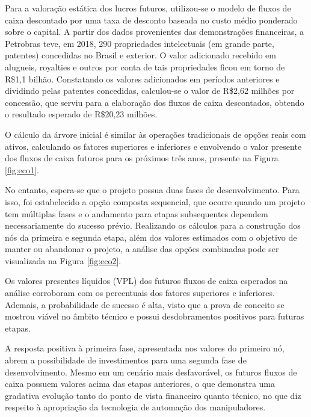 Para a valoração estática dos lucros futuros, utilizou-se o modelo de fluxos de caixa descontado por uma taxa de desconto baseada no custo médio ponderado sobre o capital. A partir dos dados provenientes das demonstrações financeiras, a Petrobras teve, em 2018, 290 propriedades intelectuais (em grande parte, patentes) concedidas no Brasil e exterior. O valor adicionado recebido em alugueis, royalties e outros por conta de tais propriedades ficou em torno de R\$1,1 bilhão. Constatando os valores adicionados em períodos anteriores e dividindo pelas patentes concedidas, calculou-se o valor de R\$2,62 milhões por concessão, que serviu para a elaboração dos fluxos de caixa descontados, obtendo o resultado esperado de R\$20,23 milhões. 

O cálculo da árvore inicial é similar às operações tradicionais de opções reais com ativos, calculando os fatores superiores e inferiores e envolvendo o valor presente dos fluxos de caixa futuros para os próximos três anos, presente na Figura \ref{fig:eco1}.


No entanto, espera-se que o projeto possua duas fases de desenvolvimento. Para isso, foi estabelecido a opção composta sequencial, que ocorre quando um projeto tem múltiplas fases e o andamento para etapas subsequentes dependem necessariamente do sucesso prévio. Realizando os cálculos para a construção dos nós da primeira e segunda etapa, além dos valores estimados com o objetivo de manter ou abandonar o projeto, a análise das opções combinadas pode ser visualizada na Figura \ref{fig:eco2}. 

Os valores presentes líquidos (VPL) dos futuros fluxos de caixa esperados na análise corroboram com os percentuais dos fatores superiores e inferiores. Ademais, a probabilidade de sucesso é alta, visto que a prova de conceito se mostrou viável no âmbito técnico e possui desdobramentos positivos para futuras etapas.


A resposta positiva à primeira fase, apresentada nos valores do primeiro nó, abrem a possibilidade de investimentos para uma segunda fase de desenvolvimento. Mesmo em um cenário mais desfavorável, os futuros fluxos de caixa possuem valores acima das etapas anteriores, o que demonstra uma gradativa evolução tanto do ponto de vista financeiro quanto técnico, no que diz respeito à apropriação da tecnologia de automação dos manipuladores.

